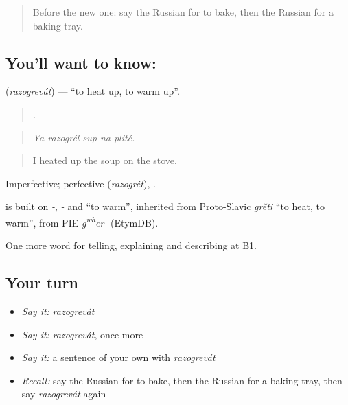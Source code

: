 \label{lesson:RU-C332-razogrevat}



\begin{quote}
Before the new one: say the Russian for to bake, then the Russian for a baking tray.
\end{quote}

\subsection*{You'll want to know: }
\textbf{} (\emph{razogrevát}) — \textquotedblleft{}to heat up, to warm up\textquotedblright{}.

\begin{quote}
    .
\end{quote}

\begin{quote}
\emph{Ya razogrél sup na plité.}
\end{quote}

\begin{quote}
I heated up the soup on the stove.
\end{quote}

Imperfective; perfective \emph{} (\emph{razogrét}), \emph{}.

\begin{cousinweb}
\emph{} is built on \emph{-}, \emph{-} and \emph{} \textquotedblleft{}to warm\textquotedblright{}, inherited from Proto-Slavic \emph{grěti} \textquotedblleft{}to heat, to warm\textquotedblright{}, from PIE \emph{g\textsuperscript{w}\textsuperscript{h}er-} (EtymDB).
\end{cousinweb}

\begin{grammarlens}[title={What you've built}]
One more word for telling, explaining and describing at B1.
\end{grammarlens}

\subsection*{Your turn}
\begin{itemize}
\raggedright
  \item \emph{Say it:} \emph{razogrevát}
  \item \emph{Say it:} \emph{razogrevát}, once more
  \item \emph{Say it:} a sentence of your own with \emph{razogrevát}
  \item \emph{Recall:} say the Russian for to bake, then the Russian for a baking tray, then say \emph{razogrevát} again
\end{itemize}

